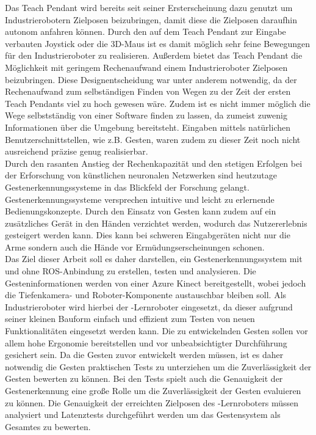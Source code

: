 Das Teach Pendant wird bereits seit seiner Ersterscheinung dazu genutzt um Industrierobotern Zielposen beizubringen, damit diese die Zielposen daraufhin autonom anfahren können. Durch den auf dem Teach Pendant zur Eingabe verbauten Joystick oder die 3D-Maus ist es damit möglich sehr feine Bewegungen für den Industrieroboter zu realisieren. Außerdem bietet das Teach Pendant die Möglichkeit mit geringem Rechenaufwand einem Industrieroboter Zielposen beizubringen. Diese Designentscheidung war unter anderem notwendig, da der Rechenaufwand zum selbständigen Finden von Wegen zu der Zeit der ersten Teach Pendants viel zu hoch gewesen wäre. Zudem ist es nicht immer möglich die Wege selbstständig von einer Software finden zu lassen, da zumeist zuwenig Informationen über die Umgebung bereitsteht. Eingaben mittels natürlichen Benutzerschnittstellen, wie z.B. Gesten, waren zudem zu dieser Zeit noch nicht ausreichend präzise genug realisierbar.\\

Durch den rasanten Anstieg der Rechenkapazität und den stetigen Erfolgen bei der Erforschung von künstlichen neuronalen Netzwerken sind heutzutage Gestenerkennungssysteme in das Blickfeld der Forschung gelangt. Gestenerkennungssysteme versprechen intuitive und leicht zu erlernende Bedienungskonzepte. Durch den Einsatz von Gesten kann zudem auf ein zusätzliches Gerät in den Händen verzichtet werden, wodurch das Nutzererlebnis gesteigert werden kann. Dies kann bei schweren Eingabgeräten nicht nur die Arme sondern auch die Hände vor Ermüdungserscheinungen schonen.\\

Das Ziel dieser Arbeit soll es daher darstellen, ein Gestenerkennungssystem mit und ohne ROS-Anbindung zu erstellen, testen und analysieren. Die Gesteninformationen werden von einer Azure Kinect bereitgestellt, wobei jedoch die Tiefenkamera- und Roboter-Komponente austauschbar bleiben soll. Als Industrieroboter wird hierbei der -Lernroboter eingesetzt, da dieser aufgrund seiner kleinen Bauform einfach und effizient zum Testen von neuen Funktionalitäten eingesetzt werden kann. Die zu entwickelnden Gesten sollen vor allem hohe Ergonomie bereitstellen und vor unbeabsichtigter Durchführung gesichert sein. Da die Gesten zuvor entwickelt werden müssen, ist es daher notwendig die Gesten praktischen Tests zu unterziehen um die Zuverlässigkeit der Gesten bewerten zu können. Bei den Tests spielt auch die Genauigkeit der Gestenerkennung eine große Rolle um die Zuverlässigkeit der Gesten evaluieren zu können. Die Genauigkeit der erreichten Zielposen des -Lernroboters müssen analysiert und Latenztests durchgeführt werden um das Gestensystem als Gesamtes zu bewerten.

